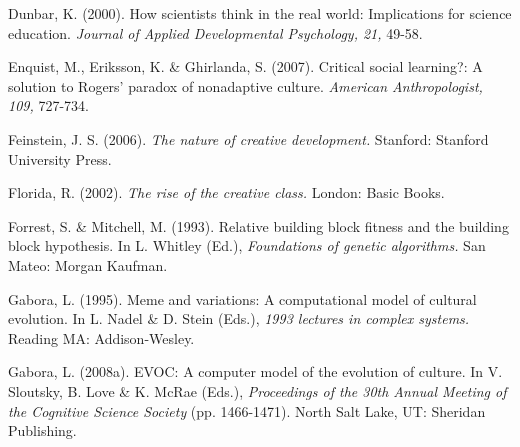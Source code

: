 \documentclass[a4paper,12pt,man,british]{apa6}
\begin{document}
\begin{description}
\item Dunbar, K. (2000). How scientists think in the real world: Implications for science education. \emph{ Journal of Applied Developmental Psychology, 21,} 49-58.

\item Enquist, M., Eriksson, K. \& Ghirlanda, S. (2007). Critical social learning?: A solution to Rogers' paradox of nonadaptive culture. \emph{American Anthropologist, 109,} 727-734.



\item Feinstein, J. S. (2006). \emph{The nature of creative development.} Stanford: Stanford University Press.


\item Florida, R. (2002). \emph{The rise of the creative class.} London: Basic Books.

\item Forrest, S. \& Mitchell, M. (1993). Relative building block fitness and the building block hypothesis. In L. Whitley (Ed.), \emph{Foundations of genetic algorithms.} San Mateo: Morgan Kaufman. 


\item Gabora, L. (1995). Meme and variations: A computational model of cultural evolution. In L. Nadel \& D. Stein (Eds.), \emph{1993 lectures in complex systems.} Reading MA: Addison-Wesley.


\item Gabora, L. (2008a). EVOC: A computer model of the evolution of culture. In V. Sloutsky, B. Love \& K. McRae (Eds.), \emph{Proceedings of the 30th Annual Meeting of the Cognitive Science Society} (pp. 1466-1471). North Salt Lake, UT: Sheridan Publishing.


\end{description}
\end{document}
